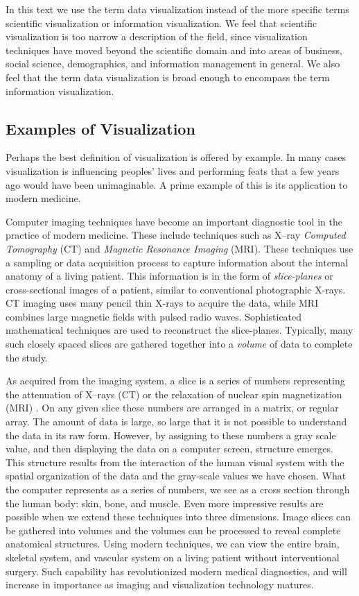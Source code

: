 In this text we use the term data visualization instead of the more specific terms scientific visualization or information visualization. We feel that scientific visualization is too narrow a description of the field, since visualization techniques have moved beyond the scientific domain and into areas of business, social science, demographics, and information management in general.
We also feel that the term data visualization is broad enough to encompass the term information visualization.

\subsection{Examples of Visualization}
Perhaps the best definition of visualization is offered by example. In many cases visualization is influencing peoples' lives and performing feats that a few years ago would have been unimaginable. A prime example of this is its application to modern medicine.

Computer imaging techniques have become an important diagnostic tool in the practice of modern medicine. These include techniques such as X--ray \emph{Computed Tomography} (CT) and \emph{Magnetic Resonance Imaging} (MRI). These techniques use a sampling or data acquisition process to capture information about the internal anatomy of a living patient. This information is in the form of \emph{slice-planes} or cross-sectional images of a patient, similar to conventional photographic X-rays. CT imaging uses many pencil thin X-rays to acquire the data, while MRI combines large magnetic fields with pulsed radio waves. Sophisticated mathematical techniques are used to reconstruct the slice-planes. Typically, many such closely spaced slices are gathered together into a \emph{volume} of data to complete the study.

As acquired from the imaging system, a slice is a series of numbers representing the attenuation of X--rays (CT) or the relaxation of nuclear spin magnetization (MRI) \cite{Krestel90}. On any given slice these numbers are arranged in a matrix, or regular array. The amount of data is large, so large that it is not possible to understand the data in its raw form. However, by assigning to these numbers a gray scale value, and then displaying the data on a computer screen, structure emerges. This structure results from the interaction of the human visual system with the spatial organization of the data and the gray-scale values we have chosen. What the computer represents as a series of numbers, we see as a cross section through the human body: skin, bone, and muscle. Even more impressive results are possible when we extend these techniques into three dimensions. Image slices can be gathered into volumes and the volumes can be processed to reveal complete anatomical structures. Using modern techniques, we can view the entire brain, skeletal system, and vascular system on a living patient without interventional surgery. Such capability has revolutionized modern medical diagnostics, and will increase in importance as imaging and visualization technology matures.

